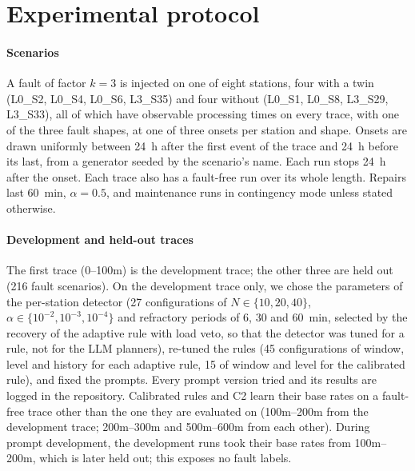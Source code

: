 \documentclass[preprint,11pt]{elsarticle}
\begin{document}
\section{Experimental protocol}
\label{sec:protocol}

\paragraph{Scenarios}
A fault of factor $k=3$ is injected on one of eight stations, four with a twin (L0\_S2, L0\_S4, L0\_S6, L3\_S35) and four without (L0\_S1, L0\_S8, L3\_S29, L3\_S33), all of which have observable processing times on every trace, with one of the three fault shapes, at one of three onsets per station and shape. Onsets are drawn uniformly between 24~h after the first event of the trace and 24~h before its last, from a generator seeded by the scenario's name. Each run stops 24~h after the onset. Each trace also has a fault-free run over its whole length. Repairs last 60~min, $\alpha=0.5$, and maintenance runs in contingency mode unless stated otherwise.

\paragraph{Development and held-out traces}
The first trace (0--100m) is the development trace; the other three are held out (216 fault scenarios). On the development trace only, we chose the parameters of the per-station detector (27 configurations of $N \in \{10, 20, 40\}$, $\alpha \in \{10^{-2}, 10^{-3}, 10^{-4}\}$ and refractory periods of 6, 30 and 60~min, selected by the recovery of the adaptive rule with load veto, so that the detector was tuned for a rule, not for the LLM planners), re-tuned the rules (45 configurations of window, level and history for each adaptive rule, 15 of window and level for the calibrated rule), and fixed the prompts. Every prompt version tried and its results are logged in the repository. Calibrated rules and C2 learn their base rates on a fault-free trace other than the one they are evaluated on (100m--200m from the development trace; 200m--300m and 500m--600m from each other). During prompt development, the development runs took their base rates from 100m--200m, which is later held out; this exposes no fault labels.
\end{document}
